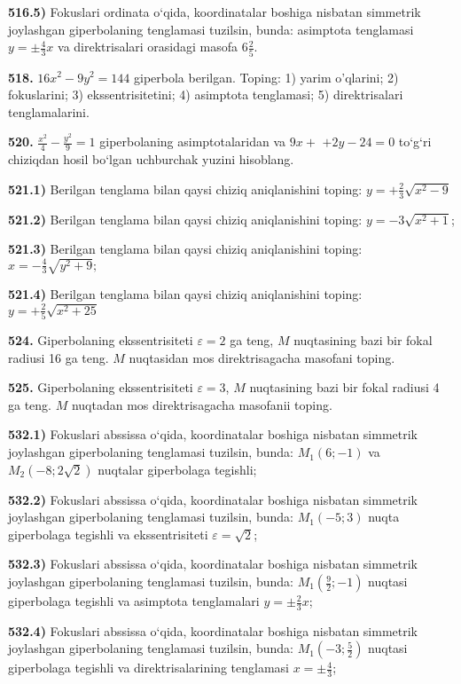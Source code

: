 \textbf{516.5)} Fokuslari ordinata o‘qida, koordinatalar boshiga nisbatan simmetrik joylashgan giperbolaning tenglamasi tuzilsin, bunda: asimptota tenglamasi $y= \pm \frac{4}{3} x$ va direktrisalari orasidagi masofa $6 \frac{2}{5}$.

\textbf{518.} $16 x^2-9 y^2=144$ giperbola berilgan. Toping: 1) yarim o'qlarini; 2) fokuslarini; 3) ekssentrisitetini; 4) asimptota tenglamasi; 5) direktrisalari tenglamalarini.

\textbf{520.} $\frac{x^2}{4}-\frac{y^2}{9}=1$ giperbolaning asimptotalaridan va $9 x+$ $+2 y-24=0$ to‘g‘ri chiziqdan hosil bo‘lgan uchburchak yuzini hisoblang.

\textbf{521.1)} Berilgan tenglama bilan qaysi chiziq aniqlanishini toping: $y=+\frac{2}{3} \sqrt{x^2-9}$

\textbf{521.2)} Berilgan tenglama bilan qaysi chiziq aniqlanishini toping: $y=-3 \sqrt{x^2+1}$;

\textbf{521.3)} Berilgan tenglama bilan qaysi chiziq aniqlanishini toping: $x=-\frac{4}{3} \sqrt{y^2+9} ;$

\textbf{521.4)} Berilgan tenglama bilan qaysi chiziq aniqlanishini toping: $y=+\frac{2}{5} \sqrt{x^2+25}$

\textbf{524.} Giperbolaning ekssentrisiteti $\varepsilon=2$ ga teng, $M$ nuqtasining bazi bir fokal radiusi 16 ga teng. $M$ nuqtasidan mos direktrisagacha masofani toping.

\textbf{525.} Giperbolaning ekssentrisiteti $\varepsilon=3$, $M$ nuqtasining bazi bir fokal radiusi 4 ga teng. $M$ nuqtadan mos direktrisagacha masofanii toping.

\textbf{532.1)} Fokuslari abssissa o‘qida, koordinatalar boshiga nisbatan simmetrik joylashgan giperbolaning tenglamasi tuzilsin, bunda: $M_1(6 ;-1)$ va $M_2(-8 ; 2 \sqrt{2})$ nuqtalar giperbolaga tegishli;

\textbf{532.2)} Fokuslari abssissa o‘qida, koordinatalar boshiga nisbatan simmetrik joylashgan giperbolaning tenglamasi tuzilsin, bunda: $M_1(-5 ; 3)$ nuqta giperbolaga tegishli va ekssentrisiteti $\varepsilon=\sqrt{2}$;

\textbf{532.3)} Fokuslari abssissa o‘qida, koordinatalar boshiga nisbatan simmetrik joylashgan giperbolaning tenglamasi tuzilsin, bunda: $M_1\left(\frac{9}{2} ;-1\right)$ nuqtasi giperbolaga tegishli va asimptota tenglamalari $y= \pm \frac{2}{3} x$;

\textbf{532.4)} Fokuslari abssissa o‘qida, koordinatalar boshiga nisbatan simmetrik joylashgan giperbolaning tenglamasi tuzilsin, bunda: $M_1\left(-3 ; \frac{5}{2}\right)$ nuqtasi giperbolaga tegishli va direktrisalarining tenglamasi $x= \pm \frac{4}{3}$;

